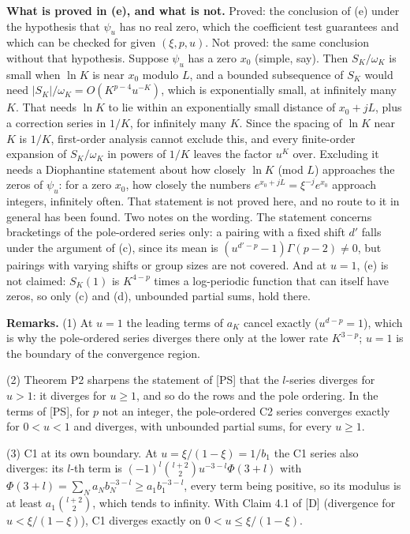 \documentclass[11pt]{article}
\begin{document}
\noindent\textbf{What is proved in (e), and what is not.} Proved: the conclusion of (e) under the hypothesis that $\psi_u$ has no real zero, which the coefficient test guarantees and which can be checked for given $(\xi,p,u)$. Not proved: the same conclusion without that hypothesis. Suppose $\psi_u$ has a zero $x_0$ (simple, say). Then $S_K/\omega_K$ is small when $\ln K$ is near $x_0$ modulo $L$, and a bounded subsequence of $S_K$ would need $|S_K|/\omega_K=O(K^{p-4}u^{-K})$, which is exponentially small, at infinitely many $K$. That needs $\ln K$ to lie within an exponentially small distance of $x_0+jL$, plus a correction series in $1/K$, for infinitely many $K$. Since the spacing of $\ln K$ near $K$ is $1/K$, first-order analysis cannot exclude this, and every finite-order expansion of $S_K/\omega_K$ in powers of $1/K$ leaves the factor $u^K$ over. Excluding it needs a Diophantine statement about how closely $\ln K$ (mod $L$) approaches the zeros of $\psi_u$: for a zero $x_0$, how closely the numbers $e^{x_0+jL}=\xi^{-j}e^{x_0}$ approach integers, infinitely often. That statement is not proved here, and no route to it in general has been found. Two notes on the wording. The statement concerns bracketings of the pole-ordered series only: a pairing with a fixed shift $d'$ falls under the argument of (c), since its mean is $(u^{d'-p}-1)\Gamma(p-2)\ne0$, but pairings with varying shifts or group sizes are not covered. And at $u=1$, (e) is not claimed: $S_K(1)$ is $K^{4-p}$ times a log-periodic function that can itself have zeros, so only (c) and (d), unbounded partial sums, hold there.

\medskip
\noindent\textbf{Remarks.} (1) At $u=1$ the leading terms of $a_K$ cancel exactly ($u^{d-p}=1$), which is why the pole-ordered series diverges there only at the lower rate $K^{3-p}$; $u=1$ is the boundary of the convergence region.

(2) Theorem P2 sharpens the statement of [PS] that the $l$-series diverges for $u>1$: it diverges for $u\ge1$, and so do the rows and the pole ordering. In the terms of [PS], for $p$ not an integer, the pole-ordered C2 series converges exactly for $0<u<1$ and diverges, with unbounded partial sums, for every $u\ge1$.

(3) C1 at its own boundary. At $u=\xi/(1-\xi)=1/b_1$ the C1 series also diverges: its $l$-th term is $(-1)^l\binom{l+2}{2}u^{-3-l}\Phi(3+l)$ with $\Phi(3+l)=\sum_Na_Nb_N^{-3-l}\ge a_1b_1^{-3-l}$, every term being positive, so its modulus is at least $a_1\binom{l+2}{2}$, which tends to infinity. With Claim 4.1 of [D] (divergence for $u<\xi/(1-\xi)$), C1 diverges exactly on $0<u\le\xi/(1-\xi)$.
\end{document}
